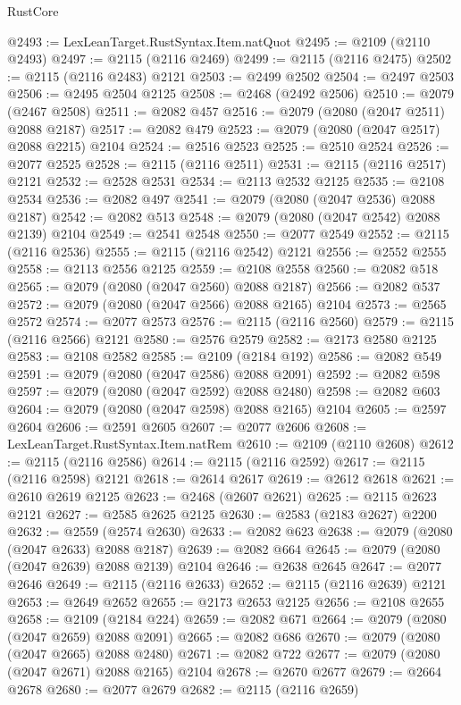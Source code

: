 \begin{lexlean}{RustCore}
\begin{coremodule}
@2493 := LexLeanTarget.RustSyntax.Item.natQuot
@2495 := @2109 (@2110 @2493)
@2497 := @2115 (@2116 @2469)
@2499 := @2115 (@2116 @2475)
@2502 := @2115 (@2116 @2483) @2121
@2503 := @2499 @2502
@2504 := @2497 @2503
@2506 := @2495 @2504 @2125
@2508 := @2468 (@2492 @2506)
@2510 := @2079 (@2467 @2508)
@2511 := @2082 @457
@2516 := @2079 (@2080 (@2047 @2511) @2088 @2187)
@2517 := @2082 @479
@2523 := @2079 (@2080 (@2047 @2517) @2088 @2215) @2104
@2524 := @2516 @2523
@2525 := @2510 @2524
@2526 := @2077 @2525
@2528 := @2115 (@2116 @2511)
@2531 := @2115 (@2116 @2517) @2121
@2532 := @2528 @2531
@2534 := @2113 @2532 @2125
@2535 := @2108 @2534
@2536 := @2082 @497
@2541 := @2079 (@2080 (@2047 @2536) @2088 @2187)
@2542 := @2082 @513
@2548 := @2079 (@2080 (@2047 @2542) @2088 @2139) @2104
@2549 := @2541 @2548
@2550 := @2077 @2549
@2552 := @2115 (@2116 @2536)
@2555 := @2115 (@2116 @2542) @2121
@2556 := @2552 @2555
@2558 := @2113 @2556 @2125
@2559 := @2108 @2558
@2560 := @2082 @518
@2565 := @2079 (@2080 (@2047 @2560) @2088 @2187)
@2566 := @2082 @537
@2572 := @2079 (@2080 (@2047 @2566) @2088 @2165) @2104
@2573 := @2565 @2572
@2574 := @2077 @2573
@2576 := @2115 (@2116 @2560)
@2579 := @2115 (@2116 @2566) @2121
@2580 := @2576 @2579
@2582 := @2173 @2580 @2125
@2583 := @2108 @2582
@2585 := @2109 (@2184 @192)
@2586 := @2082 @549
@2591 := @2079 (@2080 (@2047 @2586) @2088 @2091)
@2592 := @2082 @598
@2597 := @2079 (@2080 (@2047 @2592) @2088 @2480)
@2598 := @2082 @603
@2604 := @2079 (@2080 (@2047 @2598) @2088 @2165) @2104
@2605 := @2597 @2604
@2606 := @2591 @2605
@2607 := @2077 @2606
@2608 := LexLeanTarget.RustSyntax.Item.natRem
@2610 := @2109 (@2110 @2608)
@2612 := @2115 (@2116 @2586)
@2614 := @2115 (@2116 @2592)
@2617 := @2115 (@2116 @2598) @2121
@2618 := @2614 @2617
@2619 := @2612 @2618
@2621 := @2610 @2619 @2125
@2623 := @2468 (@2607 @2621)
@2625 := @2115 @2623 @2121
@2627 := @2585 @2625 @2125
@2630 := @2583 (@2183 @2627) @2200
@2632 := @2559 (@2574 @2630)
@2633 := @2082 @623
@2638 := @2079 (@2080 (@2047 @2633) @2088 @2187)
@2639 := @2082 @664
@2645 := @2079 (@2080 (@2047 @2639) @2088 @2139) @2104
@2646 := @2638 @2645
@2647 := @2077 @2646
@2649 := @2115 (@2116 @2633)
@2652 := @2115 (@2116 @2639) @2121
@2653 := @2649 @2652
@2655 := @2173 @2653 @2125
@2656 := @2108 @2655
@2658 := @2109 (@2184 @224)
@2659 := @2082 @671
@2664 := @2079 (@2080 (@2047 @2659) @2088 @2091)
@2665 := @2082 @686
@2670 := @2079 (@2080 (@2047 @2665) @2088 @2480)
@2671 := @2082 @722
@2677 := @2079 (@2080 (@2047 @2671) @2088 @2165) @2104
@2678 := @2670 @2677
@2679 := @2664 @2678
@2680 := @2077 @2679
@2682 := @2115 (@2116 @2659)

\end{coremodule}
\end{lexlean}
